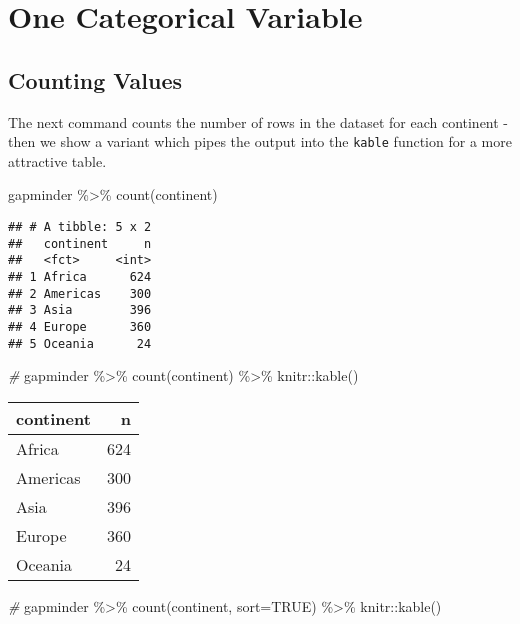 \documentclass[
]{book}
\newenvironment{Shaded}{\begin{snugshade}}{\end{snugshade}}
\newcommand{\AttributeTok}[1]{\textcolor[rgb]{0.77,0.63,0.00}{#1}}
\newcommand{\CommentTok}[1]{\textcolor[rgb]{0.56,0.35,0.01}{\textit{#1}}}
\newcommand{\ConstantTok}[1]{\textcolor[rgb]{0.00,0.00,0.00}{#1}}
\newcommand{\FunctionTok}[1]{\textcolor[rgb]{0.00,0.00,0.00}{#1}}
\newcommand{\NormalTok}[1]{#1}
\newcommand{\SpecialCharTok}[1]{\textcolor[rgb]{0.00,0.00,0.00}{#1}}
\begin{document}
\hypertarget{one-categorical-variable}{%
\section{One Categorical Variable}\label{one-categorical-variable}}

\hypertarget{counting-values}{%
\subsection{Counting Values}\label{counting-values}}

The next command counts the number of rows in the dataset for each continent - then we show a variant which pipes the output into the \texttt{kable} function for a more attractive table.

\begin{Shaded}
\begin{Highlighting}[]
\NormalTok{gapminder }\SpecialCharTok{\%\textgreater{}\%} \FunctionTok{count}\NormalTok{(continent)}
\end{Highlighting}
\end{Shaded}

\begin{verbatim}
## # A tibble: 5 x 2
##   continent     n
##   <fct>     <int>
## 1 Africa      624
## 2 Americas    300
## 3 Asia        396
## 4 Europe      360
## 5 Oceania      24
\end{verbatim}

\begin{Shaded}
\begin{Highlighting}[]
\CommentTok{\#}
\NormalTok{gapminder }\SpecialCharTok{\%\textgreater{}\%}  \FunctionTok{count}\NormalTok{(continent) }\SpecialCharTok{\%\textgreater{}\%}\NormalTok{ knitr}\SpecialCharTok{::}\FunctionTok{kable}\NormalTok{()}
\end{Highlighting}
\end{Shaded}

\begin{tabular}{l|r}
\hline
continent & n\\
\hline
Africa & 624\\
\hline
Americas & 300\\
\hline
Asia & 396\\
\hline
Europe & 360\\
\hline
Oceania & 24\\
\hline
\end{tabular}

\begin{Shaded}
\begin{Highlighting}[]
\CommentTok{\#}
\NormalTok{gapminder }\SpecialCharTok{\%\textgreater{}\%}  \FunctionTok{count}\NormalTok{(continent, }\AttributeTok{sort=}\ConstantTok{TRUE}\NormalTok{) }\SpecialCharTok{\%\textgreater{}\%}\NormalTok{ knitr}\SpecialCharTok{::}\FunctionTok{kable}\NormalTok{()}
\end{Highlighting}
\end{Shaded}
\end{document}
